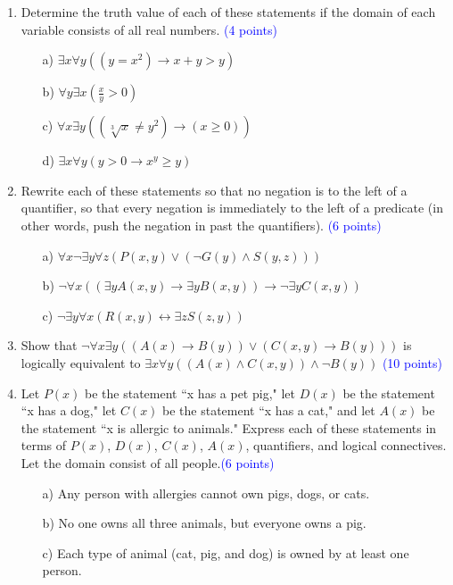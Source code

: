 \documentclass{article}
\newcommand{\pt}[1]{\textcolor{blue}{(#1 points)}}
\begin{document}
\begin{enumerate}
\begin{enumerate}
    \end{enumerate}
    
    \item Determine the truth value of each of these statements if the domain of each variable consists of all real numbers. \pt{4}
    \begin{enumerate}
        \item[a)] $\exists x \forall y((y = x^2) \rightarrow x + y > y)$\\
        \item[b)] $\forall y \exists x (\frac{x}{y} > 0)$\\
        \item[c)] $\forall x \exists y((\sqrt[3]{x} \neq y^2) \rightarrow (x \geq 0))$\\
        \item[d)] $\exists x \forall y(y > 0 \rightarrow x^y \geq y)$
    \end{enumerate}
    
    \item Rewrite each of these statements so that no negation is to the left of a quantifier, so that every negation is immediately to the left of a predicate (in other words, push the negation in past the quantifiers). \pt{6}\\
    \begin{enumerate}
        \item[a)] $\forall x \neg \exists y \forall z (P(x, y) \lor (\lnot G(y) \land S(y, z)))$\\
        \item[b)] $\neg \forall x (( \exists y A(x, y) \rightarrow \exists y B(x, y)) \rightarrow \neg \exists y C(x, y)) $\\
        \item[c)] $\neg  \exists y \forall x (R(x,y) \leftrightarrow \exists z S(z,y))$\\
    \end{enumerate}
    
    
    \item Show that $\neg \forall x \exists y ((A(x) \rightarrow B(y)) \lor (C(x, y) \rightarrow B(y)))$ is logically equivalent to $\exists x \forall y ((A(x) \land C(x, y)) \land \neg B(y))$ \pt{10}\\
    
    \item Let $P(x)$ be the statement ``x has a pet pig," let $D(x)$ be the statement ``x has a dog," let $C(x)$ be the statement ``x has a cat," and let $A(x)$ be the statement ``x is allergic to animals." Express each of these statements in terms of $P(x)$, $D(x)$, $C(x)$, $A(x)$, quantifiers, and logical connectives. Let the domain consist of all people.\pt{6}
    \begin{enumerate}
        \item[a)] Any person with allergies cannot own pigs, dogs, or cats.
        \item[b)] No one owns all three animals, but everyone owns a pig.
        \item[c)] Each type of animal (cat, pig, and dog) is owned by at least one person.
    \end{enumerate}
    

\end{enumerate}
\end{document}
